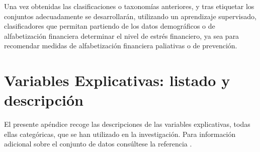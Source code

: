 \documentclass[a4paper, 11pt]{article}
\begin{document}
Una vez obtenidas las clasificaciones o taxonomías anteriores, y tras etiquetar los conjuntos
adecuadamente se desarrollarán, utilizando un aprendizaje supervisado, clasificadores que 
permitan partiendo de los datos demográficos o de alfabetización financiera determinar el 
nivel de estrés financiero, ya sea para recomendar medidas de alfabetización financiera 
paliativas o de prevención.



\section{Variables Explicativas: listado y descripción}
\label{sec:features_description}
El presente apéndice recoge las descripciones de las variables explicativas, todas ellas categóricas, 
que se han utilizado en la investigación. Para información adicional sobre el conjunto de datos 
consúltese la referencia \cite{NFCS01}.
\end{document}
